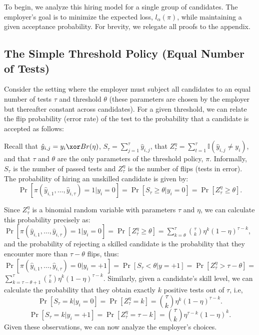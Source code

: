 To begin, we analyze this hiring model 
for a single group of candidates.
The employer's goal is to minimize the expected loss, $l_{\alpha}(\pi)$, 
while maintaining a given acceptance probability.
For brevity, we relegate all proofs to the appendix.

\subsection{The Simple Threshold Policy (Equal Number of Tests)}

Consider the setting where 
the employer must subject all candidates 
to an equal number of tests $\tau$ and threshold $\theta$ 
(these parameters are chosen by the employer but thereafter constant across candidates).
For a given threshold, we can relate
the flip probability (error rate) of the test
to the probability that a candidate is accepted as follows:

Recall that $\hat{y}_{i,j}=y_i\xor Br(\eta)$, $S_\tau=\sum_{j=1}^\tau \hat{y}_{i,j}$, that $Z^\eta_\tau=\sum_{t=1}^\tau \mathbb{I}(\hat{y}_{i,j}\neq y_i)$, and that $\tau$ and $\theta$ are the only parameters of the threshold policy, $\pi$.
Informally, $S_\tau$ is the number of passed tests
and $Z^\eta_\tau$ is the number of flips 
(tests in error).
The probability of hiring an unskilled candidate is given by:
$$\Pr[\pi(\hat{y}_{i,1},\dots,\hat{y}_{i,\tau})=1|y_i=0]=\Pr[S_{\tau}\geq \theta|y_i=0]=
\Pr[Z_{\tau}^{\eta}\geq \theta].$$

Since $Z_{\tau}^{\eta}$ is a binomial random variable with parameters $\tau$ and $\eta$, we can calculate this probability precisely as:
$\Pr[\pi(\hat{y}_{i,1},\dots,\hat{y}_{i,\tau})=1|y_i=0]=\Pr[Z_{\tau}^{\eta}\geq \theta]= \sum_{k=\theta}^\tau{\tau \choose k}\eta^k(1-\eta)^{\tau-k}$,
and the probability of rejecting a skilled candidate is the probability that they encounter more than $\tau-\theta$ flips, thus: 
$\Pr[\pi(\hat{y}_{i,1},\dots,\hat{y}_{i,\tau})=0|y_i=+1]=\Pr[S_{\tau}<\theta|y=+1]=\Pr[Z_\tau^{\eta}> \tau- \theta]=$\\
$\sum_{k=\tau- \theta+1}^{\tau}{\tau \choose k}\eta^k(1-\eta)^{\tau-k}.$
Similarly, given a candidate's skill level, 
we can calculate the probability 
that 
they obtain exactly $k$ positive tests 
out of $\tau$, i.e,
$$\Pr[S_{\tau}=k|y_i=0]=\Pr[Z_\tau^{\eta}= k]={\tau \choose k}\eta^{k}(1-\eta)^{\tau-k}.$$
$$\Pr[S_{\tau}=k|y_i=+1]=\Pr[Z_\tau^{\eta}= \tau- k]={\tau \choose k}\eta^{\tau-k}(1-\eta)^{k}.$$
Given these observations, we can now analyze the employer's choices. 

